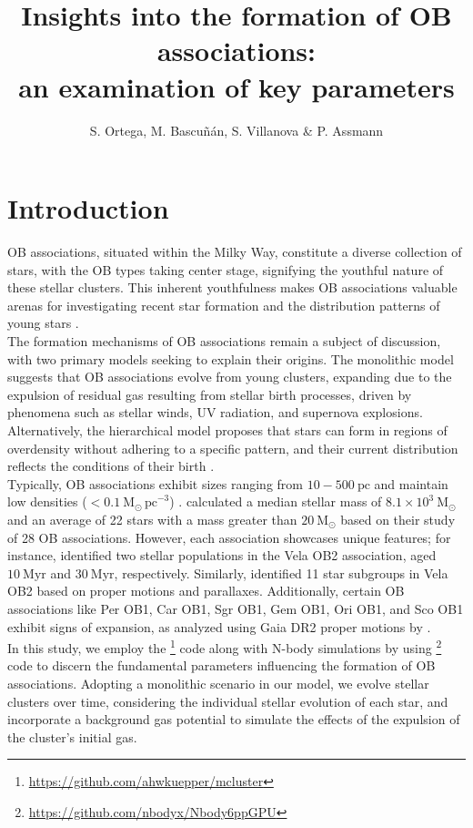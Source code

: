 \documentclass[baaa]{baaa}
\title{Insights into the formation of OB associations:\\ an examination of key parameters}
\author{S. Ortega\inst{1}, M. Bascuñán\inst{1}, S. Villanova\inst{1} \& P. Assmann\inst{1}
}
\institute{
Universidad de Concepci\'on, Chile}
\begin{document}
\maketitle
\section{Introduction}\label{S_intro}
OB associations, situated within the Milky Way, constitute a diverse collection of stars, with the OB types taking center stage, signifying the youthful nature of these stellar clusters. This inherent youthfulness makes OB associations valuable arenas for investigating recent star formation and the distribution patterns of young stars \citep{N_Wright_2020}.\\
The formation mechanisms of OB associations remain a subject of discussion, with two primary models seeking to explain their origins. The monolithic model suggests that OB associations evolve from young clusters, expanding due to the expulsion of residual gas resulting from stellar birth processes, driven by phenomena such as stellar winds, UV radiation, and supernova explosions. Alternatively, the hierarchical model proposes that stars can form in regions of overdensity without adhering to a specific pattern, and their current distribution reflects the conditions of their birth \citep{G_Carraro_2020}.\\
Typically, OB associations exhibit sizes ranging from $10-500~\mathrm{pc}$ {\citep{M&D_2017}} and maintain low densities ($<0.1 ~\mathrm{M_\odot\,pc}^{-3}$) \citep{N_Wright_2020}. \cite{M&D_2020} calculated a median stellar mass of $8.1\times10^3~\mathrm{M_\odot}$ and an average of 22 stars with a mass greater than $20 ~ \mathrm{M_\odot}$ based on their study of 28 OB associations. However, each association showcases unique features; for instance, \cite{Beccari_2018} identified two stellar populations in the Vela OB2 association, aged $10~\mathrm{Myr}$ and $30~\mathrm{Myr}$, respectively. Similarly, \cite{Cantat_Gaudin_2019} identified 11 star subgroups in Vela OB2 based on proper motions and parallaxes. Additionally, certain OB associations like Per OB1, Car OB1, Sgr OB1, Gem OB1, Ori OB1, and Sco OB1 exhibit signs of expansion, as analyzed using Gaia DR2 proper motions by \cite{M&D_2020}.\\

In this study, we employ the {} {\citep{McLuster}  \footnote{\url{https://github.com/ahwkuepper/mcluster}}} {code along with N-body simulations by using} {} {\citep{NBODY6++GPU} \footnote{\url{https://github.com/nbodyx/Nbody6ppGPU}}} code to discern the fundamental parameters influencing the formation of OB associations. Adopting a monolithic scenario in our model, we evolve stellar clusters over time, considering the individual stellar evolution of each star, and incorporate a background gas potential to simulate the effects of the expulsion of the cluster's initial gas.\\
\end{document}
